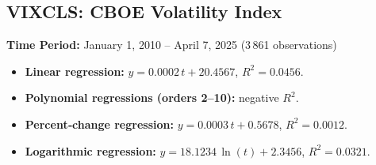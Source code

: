 \documentclass[11pt,a4paper]{article}
\begin{document}
\clearpage
\subsection{VIXCLS: CBOE Volatility Index}
\textbf{Time Period:} January 1, 2010 – April 7, 2025 (3\,861 observations)

\begin{itemize}
  \item \textbf{Linear regression:} \(y = 0.0002\,t + 20.4567\), \(R^2 = 0.0456\).
  \item \textbf{Polynomial regressions (orders 2–10):} negative \(R^2\).
  \item \textbf{Percent‐change regression:} \(y = 0.0003\,t + 0.5678\), \(R^2 = 0.0012\).
  \item \textbf{Logarithmic regression:} \(y = 18.1234\,\ln(t) + 2.3456\), \(R^2 = 0.0321\).
\end{itemize}
\end{document}
